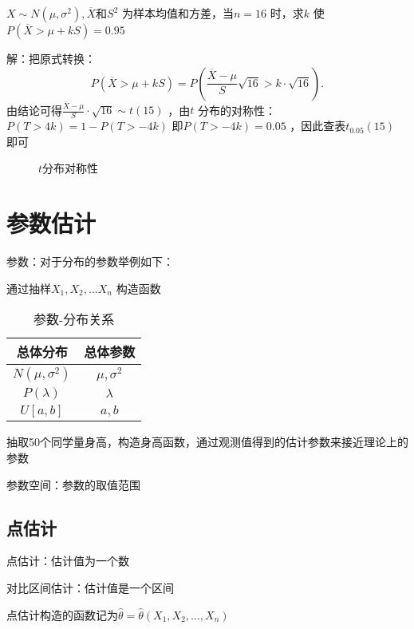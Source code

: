 \begin{eg}
    $X\sim N\left( \mu,\sigma^2  \right),\overline{X}$和$S^2 $ 为样本均值和方差，当$n=16$ 时，求$k$ 使$P\left( \overline{X}>\mu+kS \right)=0.95$
\end{eg}
解：把原式转换：\[
    P\left( \overline{X}>\mu+kS \right)=P\left( \frac{\overline{X}-\mu}{S}\sqrt{16}>k\cdot \sqrt{16} \right)
.\]
由结论可得$\frac{\overline{X}-\mu}{S}\cdot \sqrt{16}\sim t\left( 15 \right)$ ，由$t$ 分布的对称性：$P\left( T>4k \right)=1-P\left( T>-4k \right)$ 即$P\left( T>-4k \right)=0.05$ ，因此查表$t_{0.05}\left( 15 \right)$ 即可
\begin{figure}[ht]
    \centering
    \caption{$t$分布对称性}
    \label{fig:t分布对称性}
\end{figure}
\section{参数估计}%
\label{sec:参数估计}
\begin{defi}
    参数：对于分布的参数举例如下：

    通过抽样$X_1,X_2,\ldots X_{n}$ 构造函数
\end{defi}
\begin{table}[htpb]
    \centering
    \caption{参数-分布关系}
    \label{tab:参数-分布关系}
    \begin{tabular}{cc}
    \toprule
    总体分布 & 总体参数\\
    \midrule
    $N\left( \mu,\sigma^2  \right)$ & $\mu,\sigma^2 $\\
    $P\left( \lambda \right)$ & $\lambda$ \\
    $U[a,b]$ & $a,b$ \\
    \bottomrule
    \end{tabular}
\end{table}
\begin{eg}
抽取50个同学量身高，构造身高函数，通过观测值得到的估计参数来接近理论上的参数
\end{eg}
\begin{defi}
参数空间：参数的取值范围
\end{defi}
\subsection{点估计}%
\label{sub:点估计}
\begin{defi}
    点估计：估计值为一个数

    对比区间估计：估计值是一个区间
\end{defi}
点估计构造的函数记为$\hat{\theta}=\hat{\theta}\left( X_1,X_2,\ldots ,X_{n} \right)$
